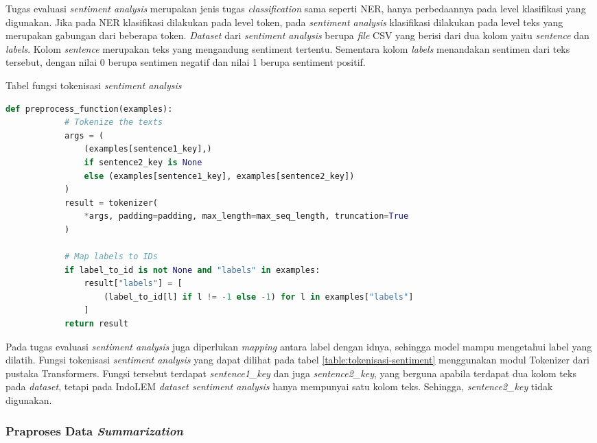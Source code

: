Tugas evaluasi \textit{sentiment analysis} merupakan jenis tugas \textit{classification} sama seperti NER, hanya perbedaannya pada level klasifikasi yang digunakan. Jika pada NER klasifikasi dilakukan pada level token, pada \textit{sentiment analysis} klasifikasi dilakukan pada level teks yang merupakan gabungan dari beberapa token. \textit{Dataset} dari \textit{sentiment analysis} berupa \textit{file} CSV yang berisi dari dua kolom yaitu \textit{sentence} dan \textit{labels}. Kolom \textit{sentence} merupakan teks yang mengandung sentiment tertentu. Sementara kolom \textit{labels} menandakan sentimen dari teks tersebut, dengan nilai 0 berupa sentimen negatif dan  nilai 1 berupa sentiment positif.

\begin{table}[h]
    \caption{Tabel fungsi tokenisasi \textit{sentiment analysis}}
    \label{table:tokenisasi-sentiment}
    \begin{lstlisting}[language=python]
        def preprocess_function(examples):
            # Tokenize the texts
            args = (
                (examples[sentence1_key],)
                if sentence2_key is None
                else (examples[sentence1_key], examples[sentence2_key])
            )
            result = tokenizer(
                *args, padding=padding, max_length=max_seq_length, truncation=True
            )

            # Map labels to IDs
            if label_to_id is not None and "labels" in examples:
                result["labels"] = [
                    (label_to_id[l] if l != -1 else -1) for l in examples["labels"]
                ]
            return result
    \end{lstlisting}
\end{table}

Pada tugas evaluasi \textit{sentiment analysis} juga diperlukan \textit{mapping} antara label dengan idnya, sehingga model mampu mengetahui label yang dilatih. Fungsi tokenisasi \textit{sentiment analysis} yang dapat dilihat pada tabel \ref{table:tokenisasi-sentiment} menggunakan modul Tokenizer dari pustaka Transformers. Fungsi tersebut terdapat \textit{sentence1\_key} dan juga \textit{sentence2\_key}, yang berguna apabila terdapat dua kolom teks pada \textit{dataset}, tetapi pada IndoLEM \textit{dataset sentiment analysis} hanya mempunyai satu kolom teks. Sehingga, \textit{sentence2\_key} tidak digunakan. 

\subsubsection{Praproses Data \textit{Summarization}}

